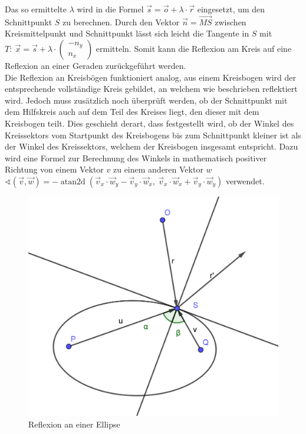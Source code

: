 \documentclass[reducespace,stylepage,semiarbeit]{spezidoc}
\DeclareMathOperator{\atantwo}{atan2d}
\begin{document}
Das so ermittelte $\lambda$ wird in die Formel $\vec{s} = \vec{o} + \lambda \cdot \vec{r}$  eingesetzt, um den Schnittpunkt $S$ zu berechnen. 
Durch den Vektor $\vec{n} = \vec{MS}$ zwischen Kreismittelpunkt und Schnittpunkt lässt sich leicht die Tangente in $S$ mit $T: ~\vec{x} = \vec{s} + \lambda \cdot \begin{pmatrix} -n_y \\ n_x \end{pmatrix}$ ermitteln.
Somit kann die Reflexion am Kreis auf eine Reflexion an einer Geraden zurückgeführt werden.\\
Die Reflexion an Kreisbögen funktioniert analog, aus einem Kreisbogen wird der entsprechende vollständige Kreis gebildet, an welchem wie beschrieben reflektiert wird. 
Jedoch muss zusätzlich noch überprüft werden, ob der Schnittpunkt mit dem \glqq Hilfskreis\grqq{} auch auf dem Teil des Kreises liegt, den dieser mit dem Kreisbogen teilt. 
Dies geschieht derart, dass festgestellt wird, ob der Winkel des Kreissektors vom Startpunkt des Kreisbogens bis zum Schnittpunkt kleiner ist als der Winkel des Kreissektors, welchem der Kreisbogen insgesamt entspricht. 
Dazu wird eine Formel zur Berechnung des Winkels in mathematisch positiver Richtung von einem Vektor $v$ zu einem anderen Vektor $w$ $\sphericalangle(\vec{v}, \vec{w}) = -\atantwo(\vec{v}_x\cdot\vec{w}_y-\vec{v}_y\cdot\vec{w}_x,~\vec{v}_x\cdot\vec{w}_x+\vec{v}_y\cdot\vec{w}_y)$  verwendet.
\newpage
\begin{figure}
\includegraphics[scale=0.7]{pictures/OvalRef.png}
\caption{Reflexion an einer Ellipse}
\label{fig:Ellipse}
\end{figure}
\end{document}
